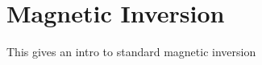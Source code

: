 \chapter{Magnetic Inversion}\label{Chp:cook:magnetic inversion}
This gives an intro to standard magnetic inversion